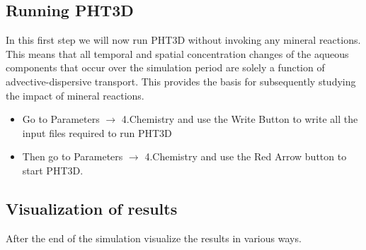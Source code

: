 \subsection[Running PHT3D]{Running PHT3D}

In this first step we will now run PHT3D without invoking any mineral reactions. This means that all temporal and spatial concentration changes of the aqueous components that occur over the simulation period are solely a function of advective-dispersive transport. This provides the basis for subsequently studying the impact of mineral reactions.    

\begin{itemize}

\item Go to {\color{blue}Parameters} $\rightarrow$ {\color{blue}4.Chemistry} and use 
the {\color{blue}Write Button} to write all the input files required to run PHT3D

\item Then go to {\color{blue}Parameters} $\rightarrow$ {\color{blue}4.Chemistry} and use the {\color{blue}Red Arrow} button to start PHT3D.

\end{itemize}

\subsection[Visualization of results]{Visualization of results}

After the end of the simulation visualize the results in various ways.

